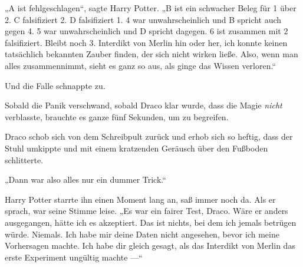 „A ist fehlgeschlagen“, sagte Harry Potter.
„B ist ein schwacher Beleg für 1 über 2. C falsifiziert 2. D falsifiziert 1. 4 war unwahrscheinlich und B spricht auch gegen 4. 5 war unwahrscheinlich und D spricht dagegen. 6 ist zusammen mit 2 falsifiziert. Bleibt noch 3. Interdikt von Merlin hin oder her, ich konnte keinen tatsächlich bekannten Zauber finden, der sich nicht wirken ließe. Also, wenn man alles zusammennimmt, sieht es ganz so aus, als ginge das Wissen verloren.“

Und die Falle schnappte zu.

Sobald die Panik verschwand, sobald Draco klar wurde, dass die Magie \emph{nicht} verblasste, brauchte es ganze fünf Sekunden, um zu begreifen.

Draco schob sich von dem Schreibpult zurück und erhob sich so heftig, dass der Stuhl umkippte und mit einem kratzenden Geräusch über den Fußboden schlitterte.

„Dann war also alles nur ein dummer Trick.“

Harry Potter starrte ihn einen Moment lang an, saß immer noch da. Als er sprach, war seine Stimme leise.
„Es war ein fairer Test, Draco. Wäre er anders ausgegangen, hätte ich es akzeptiert. Das ist nichts, bei dem ich jemals betrügen würde. Niemals. Ich habe mir deine Daten nicht angesehen, bevor ich meine Vorhersagen machte. Ich habe dir gleich gesagt, als das Interdikt von Merlin das erste Experiment ungültig machte —“

